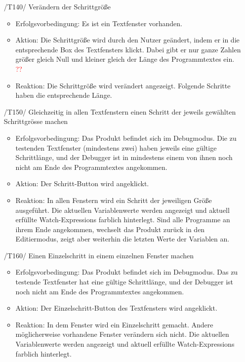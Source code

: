 \documentclass[parskip=full]{scrartcl}
\newcommand\frage[1]{\textcolor{red}{#1}}
\begin{document}
\begin{itemize}
	\item[/T140/] Verändern der Schrittgröße
		\begin{itemize}
		\item Erfolgsvorbedingung: Es ist ein Textfenster vorhanden.
		\item Aktion: Die Schrittgröße wird durch den Nutzer geändert, indem er in die entsprechende Box des Textfensters klickt. Dabei gibt er nur ganze Zahlen größer gleich Null und kleiner gleich der Länge des Programmtextes ein. \frage{??}
		\item Reaktion: Die Schrittgröße wird verändert angezeigt. Folgende Schritte haben die entsprechende Länge.
		\end{itemize}	
	
	\item[/T150/] Gleichzeitig in allen Textfenstern einen \gls{Schritt} der jeweils gewählten \gls{Schrittgrösse} machen
		\begin{itemize}
		\item Erfolgsvorbedingung: Das Produkt befindet sich im Debugmodus. Die zu testenden Textfenster (mindestens zwei) haben jeweils eine gültige Schrittlänge, und der Debugger ist in mindestens einem von ihnen noch nicht am Ende des Programmtextes angekommen.
		\item Aktion: Der Schritt-Button wird angeklickt.
		\item Reaktion:	In allen Fenstern wird ein Schritt der jeweiligen Größe ausgeführt. Die aktuellen Variablenwerte werden angezeigt und aktuell erfüllte Watch-Expressions farblich hinterlegt. Sind alle Programme an ihrem Ende angekommen, wechselt das Produkt zurück in den Editiermodus, zeigt aber weiterhin die letzten Werte der Variablen an.	
		\end{itemize}
	\item[/T160/] Einen \gls{Einzelschritt} in einem einzelnen Fenster machen
		\begin{itemize}
		\item Erfolgsvorbedingung: Das Produkt befindet sich im Debugmodus. Das zu testende Textfenster hat eine gültige Schrittlänge, und der Debugger ist noch nicht am Ende des Programmtextes angekommen.
		\item Aktion: Der Einzelschritt-Button des Textfensters wird angeklickt.
		\item Reaktion:	In dem Fenster wird ein Einzelschritt gemacht. Andere möglicherweise vorhandene Fenster verändern sich nicht. Die aktuellen Variablenwerte werden angezeigt und aktuell erfüllte Watch-Expressions farblich hinterlegt.
		\end{itemize}	
	

\end{itemize}
\end{document}
